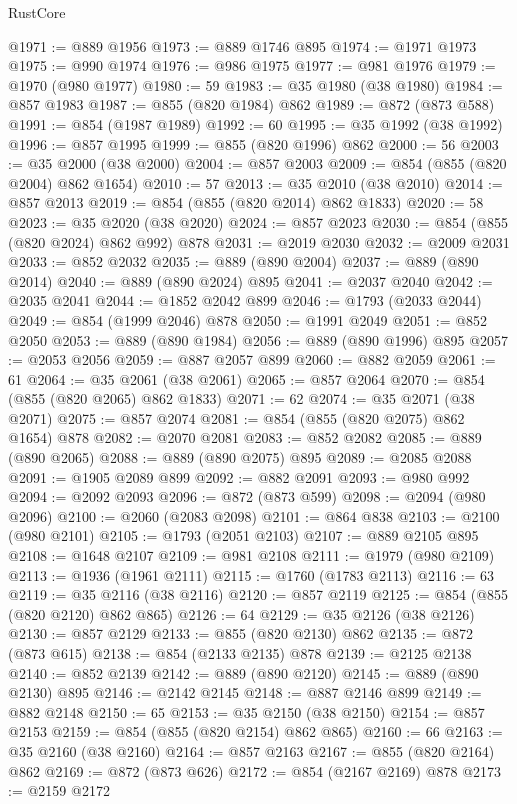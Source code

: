 \begin{lexlean}{RustCore}
\begin{coremodule}
@1971 := @889 @1956
@1973 := @889 @1746 @895
@1974 := @1971 @1973
@1975 := @990 @1974
@1976 := @986 @1975
@1977 := @981 @1976
@1979 := @1970 (@980 @1977)
@1980 := 59
@1983 := @35 @1980 (@38 @1980)
@1984 := @857 @1983
@1987 := @855 (@820 @1984) @862
@1989 := @872 (@873 @588)
@1991 := @854 (@1987 @1989)
@1992 := 60
@1995 := @35 @1992 (@38 @1992)
@1996 := @857 @1995
@1999 := @855 (@820 @1996) @862
@2000 := 56
@2003 := @35 @2000 (@38 @2000)
@2004 := @857 @2003
@2009 := @854 (@855 (@820 @2004) @862 @1654)
@2010 := 57
@2013 := @35 @2010 (@38 @2010)
@2014 := @857 @2013
@2019 := @854 (@855 (@820 @2014) @862 @1833)
@2020 := 58
@2023 := @35 @2020 (@38 @2020)
@2024 := @857 @2023
@2030 := @854 (@855 (@820 @2024) @862 @992) @878
@2031 := @2019 @2030
@2032 := @2009 @2031
@2033 := @852 @2032
@2035 := @889 (@890 @2004)
@2037 := @889 (@890 @2014)
@2040 := @889 (@890 @2024) @895
@2041 := @2037 @2040
@2042 := @2035 @2041
@2044 := @1852 @2042 @899
@2046 := @1793 (@2033 @2044)
@2049 := @854 (@1999 @2046) @878
@2050 := @1991 @2049
@2051 := @852 @2050
@2053 := @889 (@890 @1984)
@2056 := @889 (@890 @1996) @895
@2057 := @2053 @2056
@2059 := @887 @2057 @899
@2060 := @882 @2059
@2061 := 61
@2064 := @35 @2061 (@38 @2061)
@2065 := @857 @2064
@2070 := @854 (@855 (@820 @2065) @862 @1833)
@2071 := 62
@2074 := @35 @2071 (@38 @2071)
@2075 := @857 @2074
@2081 := @854 (@855 (@820 @2075) @862 @1654) @878
@2082 := @2070 @2081
@2083 := @852 @2082
@2085 := @889 (@890 @2065)
@2088 := @889 (@890 @2075) @895
@2089 := @2085 @2088
@2091 := @1905 @2089 @899
@2092 := @882 @2091
@2093 := @980 @992
@2094 := @2092 @2093
@2096 := @872 (@873 @599)
@2098 := @2094 (@980 @2096)
@2100 := @2060 (@2083 @2098)
@2101 := @864 @838
@2103 := @2100 (@980 @2101)
@2105 := @1793 (@2051 @2103)
@2107 := @889 @2105 @895
@2108 := @1648 @2107
@2109 := @981 @2108
@2111 := @1979 (@980 @2109)
@2113 := @1936 (@1961 @2111)
@2115 := @1760 (@1783 @2113)
@2116 := 63
@2119 := @35 @2116 (@38 @2116)
@2120 := @857 @2119
@2125 := @854 (@855 (@820 @2120) @862 @865)
@2126 := 64
@2129 := @35 @2126 (@38 @2126)
@2130 := @857 @2129
@2133 := @855 (@820 @2130) @862
@2135 := @872 (@873 @615)
@2138 := @854 (@2133 @2135) @878
@2139 := @2125 @2138
@2140 := @852 @2139
@2142 := @889 (@890 @2120)
@2145 := @889 (@890 @2130) @895
@2146 := @2142 @2145
@2148 := @887 @2146 @899
@2149 := @882 @2148
@2150 := 65
@2153 := @35 @2150 (@38 @2150)
@2154 := @857 @2153
@2159 := @854 (@855 (@820 @2154) @862 @865)
@2160 := 66
@2163 := @35 @2160 (@38 @2160)
@2164 := @857 @2163
@2167 := @855 (@820 @2164) @862
@2169 := @872 (@873 @626)
@2172 := @854 (@2167 @2169) @878
@2173 := @2159 @2172

\end{coremodule}
\end{lexlean}
